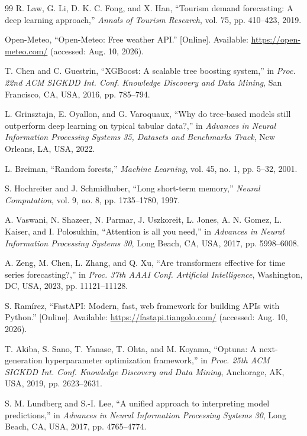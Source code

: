 \begin{thebibliography}{99}
R. Law, G. Li, D. K. C. Fong, and X. Han, ``Tourism demand forecasting: A deep learning approach,'' \textit{Annals of Tourism Research}, vol. 75, pp. 410--423, 2019.

Open-Meteo, ``Open-Meteo: Free weather API.'' [Online]. Available: \url{https://open-meteo.com/} (accessed: Aug. 10, 2026).

T. Chen and C. Guestrin, ``XGBoost: A scalable tree boosting system,'' in \textit{Proc. 22nd ACM SIGKDD Int. Conf. Knowledge Discovery and Data Mining}, San Francisco, CA, USA, 2016, pp. 785--794.

L. Grinsztajn, E. Oyallon, and G. Varoquaux, ``Why do tree-based models still outperform deep learning on typical tabular data?,'' in \textit{Advances in Neural Information Processing Systems 35, Datasets and Benchmarks Track}, New Orleans, LA, USA, 2022.

L. Breiman, ``Random forests,'' \textit{Machine Learning}, vol. 45, no. 1, pp. 5--32, 2001.

S. Hochreiter and J. Schmidhuber, ``Long short-term memory,'' \textit{Neural Computation}, vol. 9, no. 8, pp. 1735--1780, 1997.

A. Vaswani, N. Shazeer, N. Parmar, J. Uszkoreit, L. Jones, A. N. Gomez, L. Kaiser, and I. Polosukhin, ``Attention is all you need,'' in \textit{Advances in Neural Information Processing Systems 30}, Long Beach, CA, USA, 2017, pp. 5998--6008.

A. Zeng, M. Chen, L. Zhang, and Q. Xu, ``Are transformers effective for time series forecasting?,'' in \textit{Proc. 37th AAAI Conf. Artificial Intelligence}, Washington, DC, USA, 2023, pp. 11121--11128.

S. Ram\'irez, ``FastAPI: Modern, fast, web framework for building APIs with Python.'' [Online]. Available: \url{https://fastapi.tiangolo.com/} (accessed: Aug. 10, 2026).

T. Akiba, S. Sano, T. Yanase, T. Ohta, and M. Koyama, ``Optuna: A next-generation hyperparameter optimization framework,'' in \textit{Proc. 25th ACM SIGKDD Int. Conf. Knowledge Discovery and Data Mining}, Anchorage, AK, USA, 2019, pp. 2623--2631.

S. M. Lundberg and S.-I. Lee, ``A unified approach to interpreting model predictions,'' in \textit{Advances in Neural Information Processing Systems 30}, Long Beach, CA, USA, 2017, pp. 4765--4774.

\end{thebibliography}
